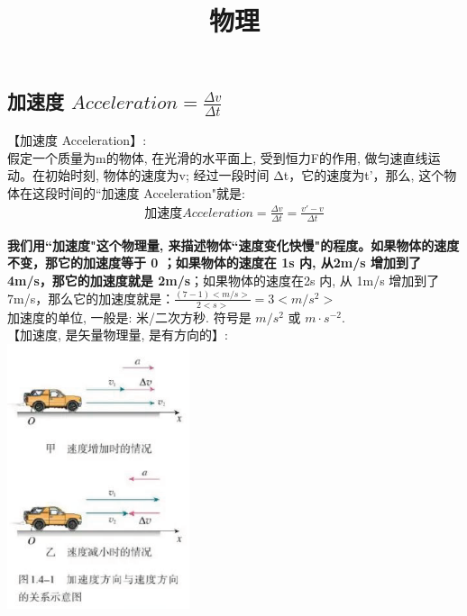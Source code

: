 \documentclass[UTF8]{ctexart}
\title{物理}
\begin{document}
	\tableofcontents %
	\date{} %
	\maketitle  %
	
	

\vspace{1em} 

\subsection{加速度 $Acceleration=\frac{\varDelta v}{\varDelta t}$}

【加速度 Acceleration】:\\
假定一个质量为m的物体, 在光滑的水平面上, 受到恒力F的作用, 做匀速直线运动。在初始时刻, 物体的速度为v; 经过一段时间 Δt，它的速度为t'，那么, 这个物体在这段时间的``加速度 Acceleration"就是: \\
\begin{align*}
	\boxed{
		\text{加速度}Acceleration=\frac{\varDelta v}{\varDelta t}=\frac{v'-v}{\varDelta t}		
	}
\end{align*}

\textbf{我们用``加速度"这个物理量, 来描述物体``速度变化快慢"的程度。如果物体的速度不变，那它的加速度等于 0 ；如果物体的速度在 1s 内, 从2m/s 增加到了 4m/s，那它的加速度就是 2m/s}；如果物体的速度在2s 内, 从 1m/s 增加到了 7m/s，那么它的加速度就是：$\frac{(7-1)<m/s>}{2<s>}=3<m/s^2>$\\

加速度的单位, 一般是: 米/二次方秒. 符号是 $m/s^2$ 或 $m·s^{-2}$.\\



【加速度, 是矢量物理量, 是有方向的】:\\
\includegraphics[width=0.4\textwidth]{img/0107.png}\\
\end{document}
